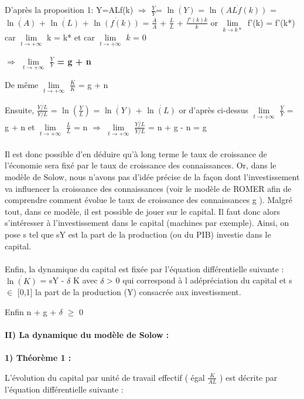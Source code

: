 \documentclass{article}
\begin{document}
D'après la proposition 1: Y=ALf(k) $\Rightarrow$ $\frac{\stackrel{.}{Y}}{Y}$= $\stackrel{.}{\ln (Y)}$ = $\stackrel{.}{\ln(ALf(k))}$ = $\stackrel{.}{\ln (A)}$ + $\stackrel{.}{\ln (L)}$ + $\stackrel{.}{\ln (f(k))}$ = $\frac{\stackrel{.}{A}}{A}$ + $\frac{\stackrel{.}{L}}{L}$ + $\frac{f'(k)\stackrel{.}{k}}{k}$
or $\lim\limits_{k \to k*}$ f'(k) = f'(k*) car $\lim\limits_{t \to +\infty}$ k = k* et car $\lim\limits_{t \to +\infty}$ $\stackrel{.}{k}$  = 0

\textbf{$\Rightarrow$  $\lim\limits_{t \to +\infty}$ $\frac{\stackrel{.}{Y}}{Y}$ = g + n}

De même $\lim\limits_{t \to +\infty}$ $\frac{\stackrel{.}{K}}{K}$ = g + n

Ensuite, $\frac{\stackrel{.}{Y/L}}{Y/L}$ = $\ln (\frac{Y}{L})$ = $\stackrel{.}{\ln (Y)}$ + $\stackrel{.}{\ln (L)}$ or d'après ci-dessus $\lim\limits_{t \to +\infty}$ $\frac{\stackrel{.}{Y}}{Y}$ = g + n  et $\lim\limits_{t \to +\infty}$ $\frac{\stackrel{.}{L}}{L}$ = n $\Rightarrow$  $\lim\limits_{t \to +\infty}$  $\frac{\stackrel{.}{Y/L}}{Y/L}$ = n + g - n = g
\\\\
Il est donc possible d'en déduire qu'à long terme le taux de croissance de l'économie sera fixé par le taux de croissance des connaissances. Or, dans le modèle de Solow, nous n'avons pas d'idée précise de la façon dont l'investissement va influencer la croissance des connaissances (voir le modèle de ROMER afin de comprendre comment évolue le taux de croissance des connaissances g ). Malgré tout, dans ce modèle, il est possible de jouer sur le capital. Il faut donc alors s'intéresser à l'investissement dans le capital (machines par exemple). Ainsi, on pose s tel que sY est la part de la production (ou du PIB) investie dans le capital.
\\\\
Enfin, la dynamique du capital est fixée par l'équation différentielle suivante : $\stackrel{.}{\ln (K)}$ = sY - $\delta$ K avec $\delta$ > 0 qui correspond à l adépréciation du capital et s $\in$ [0,1] la part de la production (Y) consacrée aux investissment. 

Enfin n + g + $\delta$ $\geq$  0
\\\\
\textbf{II) La dynamique du modèle de Solow : }
\\\\
\textbf{1) Théorème 1 : }

L'évolution du capital par unité de travail effectif ( égal $\frac{K}{AL}$ ) est décrite par l'équation différentielle suivante : 
\end{document}
